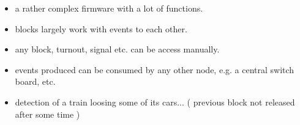 
\begin{itemize}
\item a rather complex firmware with a lot of functions.
\item blocks largely work with events to each other.
\item any block, turnout, signal etc. can be access manually.
\item events produced can be consumed by any other node, e.g. a central switch board, etc.
\item detection of a train loosing some of its cars... ( previous block not released after some time )
\end{itemize}
